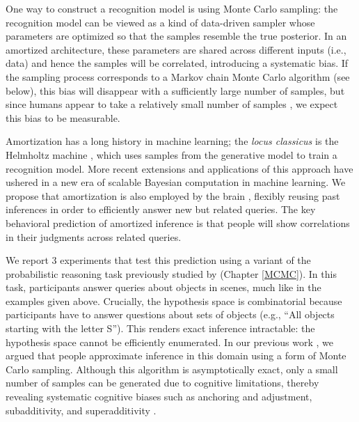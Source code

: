 One way to construct a recognition model is using Monte Carlo sampling: the recognition model can be viewed as a kind of data-driven sampler whose parameters are optimized so that the samples resemble the true posterior. In an amortized architecture, these parameters are shared across different inputs (i.e., data) and hence the samples will be correlated, introducing a systematic bias. If the sampling process corresponds to a Markov chain Monte Carlo algorithm (see below), this bias will disappear with a sufficiently large number of samples, but since humans appear to take a relatively small number of samples \citep{dasgupta17,vul2014one}, we expect this bias to be measurable.

Amortization has a long history in machine learning; the \emph{locus classicus} is the Helmholtz machine \citep{dayan1995helmholtz,hinton1995wake}, which uses samples from the generative model to train a recognition model. More recent extensions and applications of this approach \citep[e.g.,][]{rezende2014stochastic,paige2016inference,kingma2013auto,ritchie2016neurally} have ushered in a new era of scalable Bayesian computation in machine learning. We propose that amortization is also employed by the brain \citep[see][for a related proposal]{yildirim2015efficient}, flexibly reusing past inferences in order to efficiently answer new but related queries. The key behavioral prediction of amortized inference is that people will show correlations in their judgments across related queries. 

We report 3 experiments that test this prediction using a variant of the probabilistic reasoning task previously studied by \citet{dasgupta17} (Chapter \ref{MCMC}). In this task, participants answer queries about objects in scenes, much like in the examples given above. Crucially, the hypothesis space is combinatorial because participants have to answer questions about sets of objects (e.g., ``All objects starting with the letter S''). This renders exact inference intractable: the hypothesis space cannot be efficiently enumerated. In our previous work \citep{dasgupta17}, we argued that people approximate inference in this domain using a form of Monte Carlo sampling. Although this algorithm is asymptotically exact, only a small number of samples can be generated due to cognitive limitations, thereby revealing systematic cognitive biases such as anchoring and adjustment, subadditivity, and superadditivity \citep[see also][]{lieder2017empirical,lieder2017anchoring,vul2014one}.

